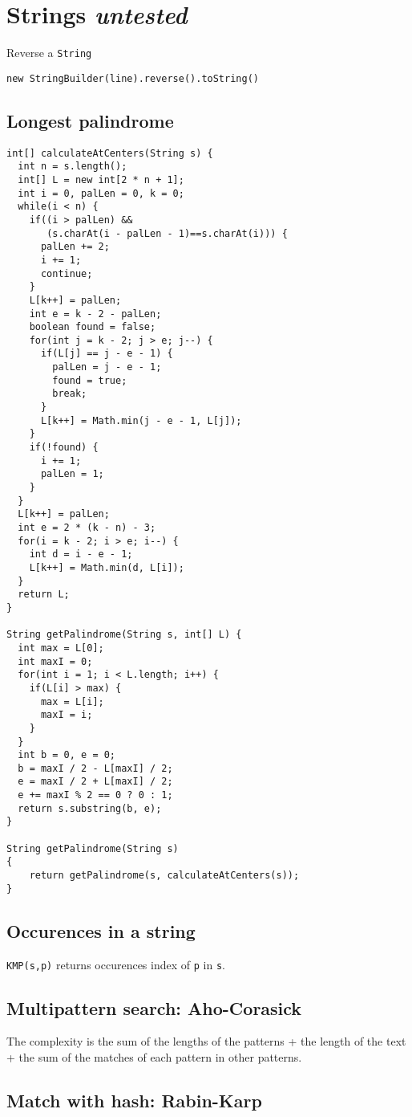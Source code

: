 \section{Strings {\footnotesize \textit{untested}}}
Reverse a \lstinline|String|
\begin{lstlisting}
new StringBuilder(line).reverse().toString()
\end{lstlisting}
\subsection{Longest palindrome}
\begin{lstlisting}
int[] calculateAtCenters(String s) {
  int n = s.length();
  int[] L = new int[2 * n + 1];
  int i = 0, palLen = 0, k = 0;
  while(i < n) {
    if((i > palLen) &&
       (s.charAt(i - palLen - 1)==s.charAt(i))) {
      palLen += 2;
      i += 1;
      continue;
    }
    L[k++] = palLen;
    int e = k - 2 - palLen;
    boolean found = false;
    for(int j = k - 2; j > e; j--) {
      if(L[j] == j - e - 1) {
        palLen = j - e - 1;
        found = true;
        break;
      }
      L[k++] = Math.min(j - e - 1, L[j]);
    }
    if(!found) {
      i += 1;
      palLen = 1;
    }
  }
  L[k++] = palLen;
  int e = 2 * (k - n) - 3;
  for(i = k - 2; i > e; i--) {
    int d = i - e - 1;
    L[k++] = Math.min(d, L[i]);
  }
  return L;
}

String getPalindrome(String s, int[] L) {
  int max = L[0];
  int maxI = 0;
  for(int i = 1; i < L.length; i++) {
    if(L[i] > max) {
      max = L[i];
      maxI = i;
    }
  }
  int b = 0, e = 0;
  b = maxI / 2 - L[maxI] / 2;
  e = maxI / 2 + L[maxI] / 2;
  e += maxI % 2 == 0 ? 0 : 1;
  return s.substring(b, e);
}

String getPalindrome(String s)
{
	return getPalindrome(s, calculateAtCenters(s));
}
\end{lstlisting}

\subsection{Occurences in a string}

\lstinline{KMP(s,p)} returns occurences index of
\lstinline{p} in \lstinline{s}.



\subsection{Multipattern search: Aho-Corasick}
The complexity is the sum of the lengths of the patterns +
the length of the text + the sum of the matches of each pattern
in other patterns.



\subsection{Match with hash: Rabin-Karp}


